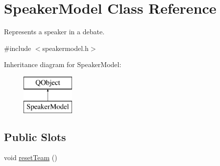 \hypertarget{classSpeakerModel}{\section{Speaker\-Model Class Reference}
\label{classSpeakerModel}
}


Represents a speaker in a debate.  




{\ttfamily \#include $<$speakermodel.\-h$>$}

Inheritance diagram for Speaker\-Model\-:\begin{figure}[H]
\begin{center}
\leavevmode
\includegraphics[height=2.000000cm]{classSpeakerModel}
\end{center}
\end{figure}
\subsection*{Public Slots}
\begin{DoxyCompactItemize}
\item 
void \hyperlink{classSpeakerModel_a8c432f96c571375bc177265f1b1cf39f}{reset\-Team} ()
\end{DoxyCompactItemize}
